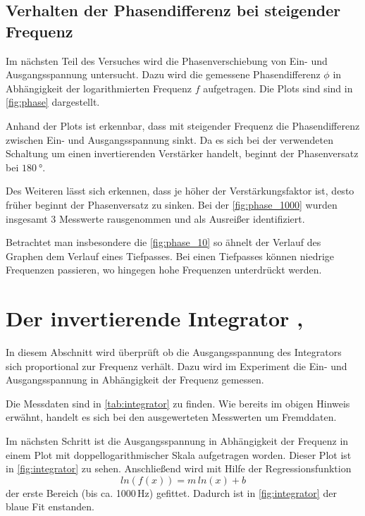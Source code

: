 \subsection{Verhalten der Phasendifferenz bei steigender Frequenz}
Im nächsten Teil des Versuches wird die Phasenverschiebung von Ein- und Ausgangsspannung 
untersucht.
Dazu wird die gemessene Phasendifferenz $\phi$ in Abhängigkeit der logarithmierten Frequenz $f$
aufgetragen.
Die Plots sind sind in \autoref{fig:phase} dargestellt.

Anhand der Plots ist erkennbar, dass mit steigender Frequenz die Phasendifferenz zwischen 
Ein- und Ausgangsspannung sinkt.
Da es sich bei der verwendeten Schaltung um einen invertierenden Verstärker handelt, beginnt 
der Phasenversatz bei $\SI{180}{\degree}$.

Des Weiteren lässt sich erkennen, dass je höher der Verstärkungsfaktor ist, desto früher
beginnt der Phasenversatz zu sinken. 
Bei der \autoref{fig:phase_1000} wurden insgesamt 3 Messwerte rausgenommen und 
als Ausreißer identifiziert.

Betrachtet man insbesondere die \autoref{fig:phase_10} so ähnelt der Verlauf
des Graphen dem Verlauf eines Tiefpasses.
Bei einen Tiefpasses können niedrige Frequenzen passieren, wo hingegen hohe Frequenzen
unterdrückt werden.

\section{Der invertierende Integrator \cite{int_data}, \cite{int_picture}}
In diesem Abschnitt wird überprüft ob die Ausgangsspannung des Integrators sich proportional 
zur Frequenz verhält.
Dazu wird im Experiment die Ein- und Ausgangsspannung in Abhängigkeit der Frequenz gemessen.

Die Messdaten sind in \autoref{tab:integrator} zu finden. 
Wie bereits im obigen Hinweis erwähnt, handelt es sich bei den ausgewerteten Messwerten
um Fremddaten.

Im nächsten Schritt ist die Ausgangsspannung in Abhängigkeit der Frequenz in einem Plot
mit doppellogarithmischer Skala aufgetragen worden.
Dieser Plot ist in \autoref{fig:integrator} zu sehen.
Anschließend wird mit Hilfe der Regressionsfunktion
\begin{equation*}
    ln(f(x)) =  m\,ln(x) + b
\end{equation*}
der erste Bereich (bis ca. 1000\,Hz) gefittet.
Dadurch ist in \autoref{fig:integrator} der blaue Fit enstanden.


